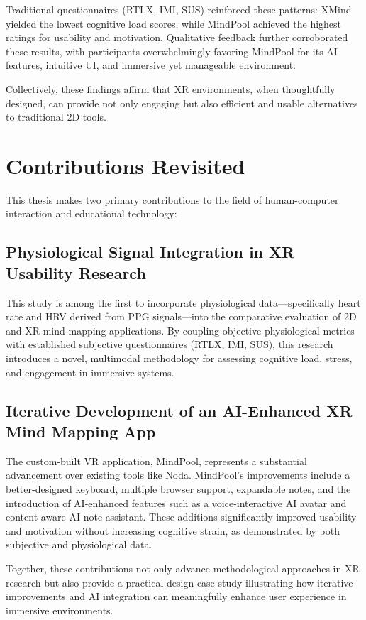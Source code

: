 \documentclass{CPP}
\begin{document}
Traditional questionnaires (RTLX, IMI, SUS) reinforced these patterns: XMind yielded the lowest cognitive load scores, while MindPool achieved the highest ratings for usability and motivation. Qualitative feedback further corroborated these results, with participants overwhelmingly favoring MindPool for its AI features, intuitive UI, and immersive yet manageable environment.

Collectively, these findings affirm that XR environments, when thoughtfully designed, can provide not only engaging but also efficient and usable alternatives to traditional 2D tools.

\section{Contributions Revisited}

This thesis makes two primary contributions to the field of human-computer interaction and educational technology:

\subsection{Physiological Signal Integration in XR Usability Research} This study is among the first to incorporate physiological data—specifically heart rate and HRV derived from PPG signals—into the comparative evaluation of 2D and XR mind mapping applications. By coupling objective physiological metrics with established subjective questionnaires (RTLX, IMI, SUS), this research introduces a novel, multimodal methodology for assessing cognitive load, stress, and engagement in immersive systems.

\subsection{Iterative Development of an AI-Enhanced XR Mind Mapping App}
 The custom-built VR application, MindPool, represents a substantial advancement over existing tools like Noda. MindPool’s improvements include a better-designed keyboard, multiple browser support, expandable notes, and the introduction of AI-enhanced features such as a voice-interactive AI avatar and content-aware AI note assistant. These additions significantly improved usability and motivation without increasing cognitive strain, as demonstrated by both subjective and physiological data.

Together, these contributions not only advance methodological approaches in XR research but also provide a practical design case study illustrating how iterative improvements and AI integration can meaningfully enhance user experience in immersive environments.
\end{document}
